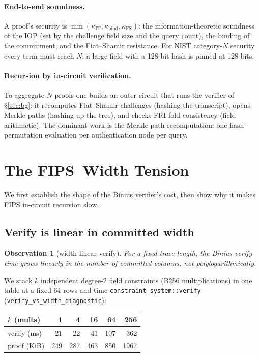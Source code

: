 \documentclass[11pt]{article}
\newtheorem{observation}{Observation}
\newcommand{\kbind}{\kappa_{\mathrm{bind}}}
\newcommand{\kfs}{\kappa_{\mathrm{FS}}}
\newcommand{\kit}{\kappa_{\mathrm{IT}}}
\begin{document}
\paragraph{End-to-end soundness.} A proof's security is
$\min(\kit,\kbind,\kfs)$: the information-theoretic soundness of the IOP (set by
the challenge field size and the query count), the binding of the commitment, and
the Fiat--Shamir resistance. For NIST category-$N$ security~\cite{nistpqc} every
term must reach $N$; a large field with a 128-bit hash is pinned at 128 bits.

\paragraph{Recursion by in-circuit verification.} To aggregate $N$ proofs one
builds an outer circuit that runs the verifier of \S\ref{sec:bg}: it recomputes
Fiat--Shamir challenges (hashing the transcript), opens Merkle paths (hashing up
the tree), and checks FRI fold consistency (field arithmetic). The dominant work
is the Merkle-path recomputation: one hash-permutation evaluation per authentication
node per query.

\section{The FIPS--Width Tension}\label{sec:tension}

We first establish the shape of the Binius verifier's cost, then show why it makes
FIPS in-circuit recursion slow.

\subsection{Verify is linear in committed width}

\begin{observation}[width-linear verify]\label{obs:width}
For a fixed trace length, the Binius verify time grows linearly in the number of
committed columns, not polylogarithmically.
\end{observation}

We stack $k$ independent degree-2 field constraints (B256 multiplications) in one
table at a fixed $64$ rows and time \texttt{constraint\_system::verify}
(\texttt{verify\_vs\_width\_diagnostic}):

\begin{center}
\begin{tabular}{lrrrrr}
\toprule
$k$ (mults) & 1 & 4 & 16 & 64 & 256\\
\midrule
verify (ms)  & 21  & 22  & 41  & 107 & 362\\
proof (KiB)  & 249 & 287 & 463 & 850 & 1967\\
\bottomrule
\end{tabular}
\end{center}
\end{document}
